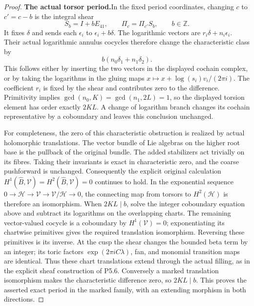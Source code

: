 \begin{proof}
\par\medskip\noindent\textbf{The actual torsor period.}\enspace In the fixed period
coordinates, changing \(c\) to \(c'=c-b\) is the integral
shear
\[
 S_b=I+bE_{41},\qquad
 \Pi_c=\Pi_{c'}S_b,\qquad b\in\mathbb Z.
\]
It fixes \(\delta\) and sends each \(\epsilon_i\) to
\(\epsilon_i+b\delta\).  The logarithmic vectors are
\(r_i\delta+n_i\epsilon_i\).  Their actual logarithmic
annulus cocycles therefore change the characteristic class
by
\[
             b(n_0\delta_1+n_1\delta_2).
\]
This follows either by inserting the two vectors in the
displayed cochain complex, or by taking the logarithms in the
gluing maps \(x\mapsto x+\log(s_i)v_i/(2\pi i)\).
The coefficient \(r_i\) is fixed by the shear and contributes
zero to the difference.  Primitivity implies
\(\gcd(n_0,K)=\gcd(n_1,2L)=1\), so the displayed torsion
element has order exactly \(2KL\).  A change of logarithm
branch changes its cochain representative by a coboundary
and leaves this conclusion unchanged.

For completeness, the zero of this characteristic obstruction
is realized by actual holomorphic translations.  The vector
bundle of Lie algebras on the higher root base is the pullback
of the original bundle.  The added stabilizers act trivially
on its fibres.  Taking their invariants is exact in
characteristic zero, and the coarse pushforward is unchanged.
Consequently the explicit original calculation
\(H^1(\widehat B,\mathcal V)=H^2(\widehat B,\mathcal V)=0\)
continues to hold.  In the exponential sequence
\(0\to\mathcal H\to\mathcal V\to\mathcal V/\mathcal H\to0\),
the connecting map from torsors to \(H^2(\mathcal H)\) is
therefore an isomorphism.  When \(2KL\mid b\), solve the
integer coboundary equation above and subtract its logarithms
on the overlapping charts.  The remaining vector-valued
cocycle is a coboundary by \(H^1(\mathcal V)=0\); exponentiating
its chartwise primitives gives the required translation
isomorphism.  Reversing these primitives is its inverse.
At the cusp the shear changes the bounded beta term by an
integer; its toric factors \(\exp(2\pi i C\lambda)\), fan,
and monomial transition maps are identical.  Thus these chart
translations extend through the actual filling, as in the
explicit sheaf construction of P5.6.  Conversely a marked
translation isomorphism makes the characteristic difference
zero, so \(2KL\mid b\).  This proves the asserted exact
period in the marked family, with an extending morphism in
both directions.


\end{proof}
